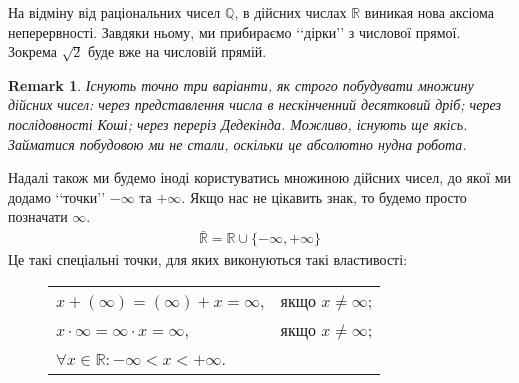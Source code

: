 \documentclass[a4paper, 14pt]{article}
\theoremstyle{theoremdd}
\theoremstyle{theoremdd}
\theoremstyle{theoremdd}
\theoremstyle{theoremdd}
\theoremstyle{theoremdd}
\theoremstyle{theoremdd}
\newtheorem{remark}[theorem]{Remark}
\theoremstyle{theoremdd}
\theoremstyle{theoremdd}
\begin{document}
	На відміну від раціональних чисел $\mathbb{Q}$, в дійсних числах $\mathbb{R}$ виникая нова аксіома неперервності. Завдяки ньому, ми прибираємо \lq\lq дірки\rq\rq \text{} з числової прямої. Зокрема $\sqrt{2}$ буде вже на числовій прямій.

\iffalse
	\begin{remark}
	Множина раціональних чисел як раз не має аксіоми неперервності. Зокрема розглянемо множини $A = \{x \in \mathbb{Q}: x^2 < 2 \text{ або } x < 0\}$ та $B = \{x \in \mathbb{Q}: x^2 \geq 2 \text{ та } x > 0\}$. Цілком зрозуміло, що $\forall a \in A, \forall b \in B: a < b$. Однак не існує числа $c \in \mathbb{Q}$, щоб $a \leq c \leq b$.\\
	!Припустимо, що таке $c \in \mathbb{Q}$ все ж таки існує. Тоді $\forall a \in A: a \leq c$, зокрема для всіх $a \in A$, для яких $0 < a^2 < 2$. Водночас $a^2 \leq c^2$. Із цих двох нерівностей випливає, що $c^2 \geq 2$. Неможливо, щоб $c^2 < 2$, бо можна розглянути число $d = 2 - c^2 > 0$, а згодом розглянути $a+rd,r \in \mathbb{Q}$; тоді $(a+rd)^2 = a^2 + 2ard + r^2d^2$
	\end{remark}
\fi
	
	\begin{remark}
	Існують точно три варіанти, як строго побудувати множину дійсних чисел: через представлення числа в нескінченний десятковий дріб; через послідовності Коші; через переріз Дедекінда. Можливо, існують ще якісь. Займатися побудовою ми не стали, оскільки це абсолютно нудна робота.
	\end{remark}
	
	Надалі також ми будемо іноді користуватись множиною дійсних чисел, до якої ми додамо \lq\lq точки\rq\rq \text{} $-\infty$ та $+\infty$. Якщо нас не цікавить знак, то будемо просто позначати $\infty$.
	\begin{align*}
	\bar{\mathbb{R}} = \mathbb{R} \cup \{-\infty, +\infty\}
	\end{align*}
	Це такі спеціальні точки, для яких виконуються такі властивості:
	\begin{figure}[H]
	\centering
	\begin{tabular}{ll}
	$x + (\infty) = (\infty) + x = \infty$, & якщо $x \neq \infty$;\\
	$x \cdot \infty = \infty \cdot x = \infty$, & якщо $x \neq \infty$;\\
	$\forall x \in \mathbb{R}: -\infty < x < +\infty$. &
	\end{tabular}
	\end{figure}
\end{document}
